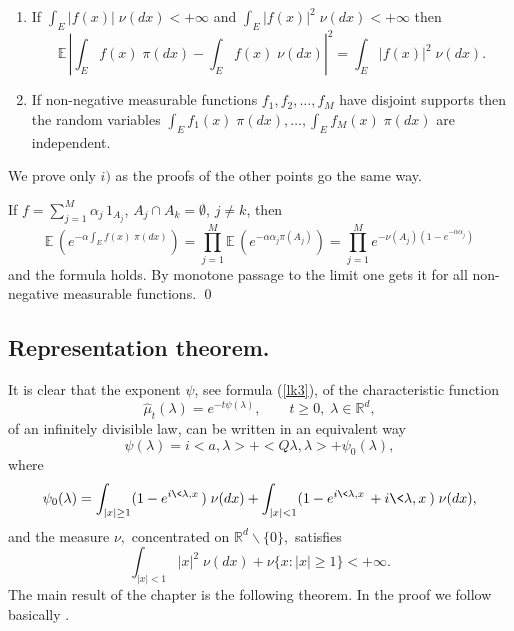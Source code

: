 \documentclass[preprint]{imsart}
\def\E{\mathbb E}
\def\R{\mathbb R}
\begin{document}
{\begin{Theorem}
\begin{enumerate}
\item[iv)] If $\int_E|f(x)|\; \nu (dx)<+\infty$
and $\int_E|f(x)|^2\; \nu (dx)<+\infty$
then
$$\E\, \left|\int_Ef(x)\; \pi (dx)
- \int_Ef(x)\; \nu (dx)\right|^2=
\int_E|f(x)|^2\; \nu (dx).
$$


\item[v)] If non-negative measurable functions
$f_1,f_2,\ldots , f_M$ have disjoint supports then the random
variables
$\int_Ef_1(x)\; \pi (dx),\dots,\int_Ef_M(x)\; \pi (dx)$ are
independent.


 \end{enumerate}
\end{Theorem}

 We
prove only $i)$ as the proofs of the other points go the same way.

\noindent If $f=\sum_{j=1}^M\alpha_j\, 1_{A_j}$, $A_j\cap A_k=\emptyset$,
$j\neq k$, then
$$
\E\, \left(e^{-\alpha \int_Ef(x)\; \pi (dx)}\right)
=\prod_{j=1}^M \E\, (e^{-\alpha \alpha_j \pi (A_j)})
=\prod_{j=1}^M e^{-\nu (A_j)(1-e^{-\alpha \alpha_j}) }
$$
and the formula holds. By monotone passage to the limit
one gets it for all
non-negative measurable functions.
\qed


\subsection{Representation theorem.}
It is clear that the exponent $\psi$, see formula (\ref{lk3}), of the characteristic  function
$$
\widehat{\mu}_t(\lambda)=e^{-t\psi(\lambda)},\qquad t\geq 0,\;
\lambda\in\R^d,
$$
of an  infinitely divisible law, can be written in an equivalent way
\begin{equation}
  \psi(\lambda)= i<a, \lambda> + <Q \lambda, \lambda> + \psi_{0}(\lambda),
\end{equation}
where
\begin{equation}\label{quattrostelle}
  \psi_{0}(\lambda)= \int_{|x|\geq 1}(1-e^{i\<\lambda,x\>})\;\nu(dx)
  +\int_{|x|< 1}(1-e^{i\<\lambda,x\>}+i\<\lambda,x\>)\;\nu(dx),
\end{equation}
and the measure $\nu,$ concentrated  on $\R^d\backslash \{0\},$ satisfies
$$
\int_{|x|< 1}|x|^2\;\nu(dx) + \nu \{x: |x|\geq 1 \} <+\infty.
$$
The main result of the chapter is the following theorem. In the proof
we follow basically \cite{bertoin}.

}
\end{document}
